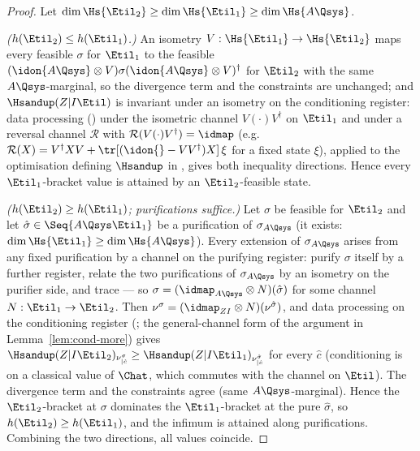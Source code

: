 \begin{proof}
Let $\dim\Hs{\Etil_2}\ge\dim\Hs{\Etil_1}\ge\dim\Hs{A\Qsys}$.

\emph{($h(\Etil_2)\le h(\Etil_1)$.)} An isometry
$V:\Hs{\Etil_1}\to\Hs{\Etil_2}$ maps every feasible $\sigma$ for
$\Etil_1$ to the feasible
$(\idon{A\Qsys}\otimes V)\sigma(\idon{A\Qsys}\otimes V)^{\dagger}$ for
$\Etil_2$ with the same $A\Qsys$-marginal, so the divergence term and
the constraints are unchanged; and $\Hsandup(Z|I\Etil)$ is invariant
under an isometry on the conditioning register: data processing
(\cite[Thm.~4.1, Eq.~(4.82)]{tomamichel2016finite}) under the
isometric channel $V(\cdot)V^{\dagger}$ on $\Etil_1$ and under a
reversal channel $\mathcal{R}$ with $\mathcal{R}(V(\cdot)V^{\dagger})=\idmap$
(e.g.\ $\mathcal{R}(X)=V^{\dagger}XV+\tr[(\idon{}-VV^{\dagger})X]\,\xi$ for a
fixed state $\xi$), applied to the optimisation defining $\Hsandup$ in
, gives both inequality directions.
Hence every $\Etil_1$-bracket value is attained
by an $\Etil_2$-feasible state.

\emph{($h(\Etil_2)\ge h(\Etil_1)$; purifications suffice.)} Let
$\sigma$ be feasible for $\Etil_2$ and let
$\hat\sigma\in\Seq{A\Qsys\Etil_1}$ be a purification of
$\sigma_{A\Qsys}$ (it exists: $\dim\Hs{\Etil_1}\ge\dim\Hs{A\Qsys}$).
Every extension of $\sigma_{A\Qsys}$ arises from any fixed
purification by a channel on the purifying register: purify $\sigma$
itself by a further register, relate the two purifications of
$\sigma_{A\Qsys}$ by an isometry on the purifier side, and trace ---
so $\sigma=(\idmap_{A\Qsys}\otimes N)(\hat\sigma)$ for some channel
$N:\Etil_1\to\Etil_2$. Then
$\nu^{\sigma}=(\idmap_{ZI}\otimes N)(\nu^{\hat\sigma})$, and data
processing on the conditioning register
(\cite[Thm.~4.1, Eq.~(4.82)]{tomamichel2016finite}; the general-channel
form of the argument in Lemma~\ref{lem:cond-more}) gives
$\Hsandup(Z|I\Etil_2)_{\nu^{\sigma}_{|\hat c}}
\ge\Hsandup(Z|I\Etil_1)_{\nu^{\hat\sigma}_{|\hat c}}$ for every
$\hat c$ (conditioning is on a classical value of $\Chat$, which
commutes with the channel on $\Etil$). The divergence term and the
constraints agree (same $A\Qsys$-marginal). Hence the
$\Etil_2$-bracket at $\sigma$ dominates the $\Etil_1$-bracket at the
pure $\hat\sigma$, so $h(\Etil_2)\ge h(\Etil_1)$, and the infimum is
attained along purifications. Combining the two directions, all values
coincide.
\end{proof}
